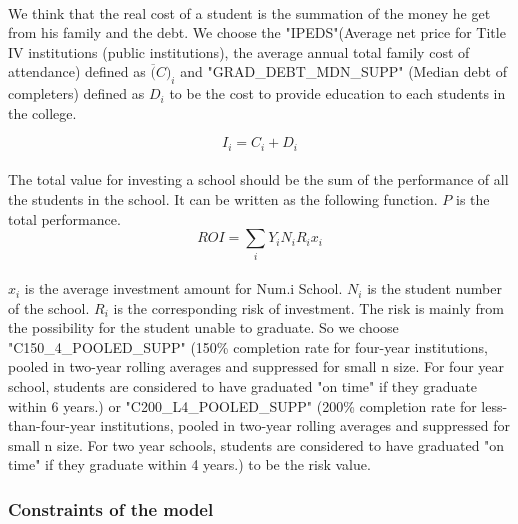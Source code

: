 \documentclass{mcmthesis}
\begin{document}
\paragraph{} We think that the real cost of a student is the summation of the money he get from his family and the debt. We choose the "IPEDS"(Average net price for Title IV institutions (public institutions), the average annual total family cost of attendance) defined as $\overline(C)_i$ and "GRAD\_DEBT\_MDN\_SUPP" (Median debt of completers) defined as $D_i$ to be the cost to provide education to each students in the college.

\begin{equation}
I_i=C_i+D_i
\end{equation}

\paragraph{} The total value for investing a school should be the sum of the performance of all the students in the school. It can be written as the following function. $P$ is the total performance. 
\begin{equation}
ROI=\sum_i Y_i N_i R_i x_i
\end{equation}

\paragraph{} $x_i$ is the average investment amount for Num.i School. $N_i$ is the student number of the school. $R_i$ is the corresponding risk of investment. The risk is mainly from the possibility for the student unable to graduate. So we choose "C150\_4\_POOLED\_SUPP" (150\% completion rate for four-year institutions, pooled in two-year rolling averages and suppressed for small n size.  For four year school, students are considered to have graduated "on time" if they graduate within 6 years.) or "C200\_L4\_POOLED\_SUPP" (200\% completion rate for less-than-four-year institutions, pooled in two-year rolling averages and suppressed for small n size.  For two year schools, students are considered to have graduated "on time" if they graduate within 4 years.) to be the risk value.


\subsubsection{Constraints of the model}
\end{document}
